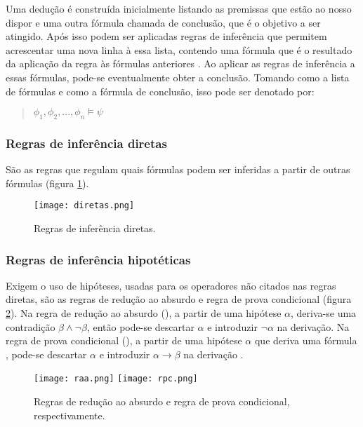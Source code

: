 Uma dedução é construída inicialmente listando as premissas que estão ao nosso dispor e uma outra fórmula chamada de conclusão, que é o objetivo a ser atingido. Após isso podem ser aplicadas regras de inferência que permitem acrescentar uma nova linha à essa lista, contendo uma fórmula que é o resultado da aplicação da regra às fórmulas anteriores \cite{mortari2001}. Ao aplicar as regras de inferência a essas fórmulas, pode-se eventualmente obter a conclusão. Tomando  como a lista de fórmulas e  como a fórmula de conclusão, isso pode ser denotado por:

\begin{quote}\centering
    $\phi_1, \phi_2, ..., \phi_n \models \psi $
\end{quote}

\subsubsection{Regras de inferência diretas}

São as regras que regulam quais fórmulas podem ser inferidas a partir de outras fórmulas (figura \ref{fig:diretas}).

\begin{figure}[!htb]
	\centering
	\caption[Regras de inferência diretas]{Regras de inferência diretas.}
	\texttt{[image: diretas.png]}
	\label{fig:diretas}
\end{figure}

\subsubsection{Regras de inferência hipotéticas}

Exigem o uso de hipóteses, usadas para os operadores não citados nas regras diretas, são as regras de redução ao absurdo e regra de prova condicional (figura \ref{fig:hip}). Na regra de redução ao absurdo (), a partir de uma hipótese $\alpha$, deriva-se uma contradição $\beta \land \neg \beta$, então pode-se descartar $\alpha$ e introduzir $\neg \alpha$ na derivação. Na regra de prova condicional (), a partir de uma hipótese $\alpha$ que deriva uma fórmula , pode-se descartar $\alpha$ e introduzir $\alpha \rightarrow \beta$ na derivação \cite{mortari2001}.

\begin{figure}[!htb]
	\centering
	\caption[Regras de inferência hipotéticas]{Regras de redução ao absurdo e regra de prova condicional, respectivamente.}
	\texttt{[image: raa.png]}
	\texttt{[image: rpc.png]}
	\label{fig:hip}
\end{figure}


